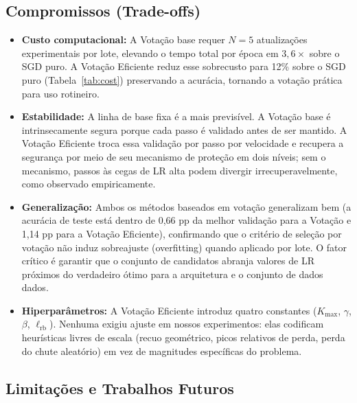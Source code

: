 \documentclass[conference]{IEEEtran}
\begin{document}
\subsection{Compromissos (Trade-offs)}

\begin{itemize}
\item \textbf{Custo computacional:} A Votação base requer $N = 5$ atualizações experimentais por lote, elevando o tempo total por época em $3,6\times$ sobre o SGD puro. A Votação Eficiente reduz esse sobrecusto para 12\% sobre o SGD puro (Tabela~\ref{tab:cost}) preservando a acurácia, tornando a votação prática para uso rotineiro.
\item \textbf{Estabilidade:} A linha de base fixa é a mais previsível. A Votação base é intrinsecamente segura porque cada passo é validado antes de ser mantido. A Votação Eficiente troca essa validação por passo por velocidade e recupera a segurança por meio de seu mecanismo de proteção em dois níveis; sem o mecanismo, passos às cegas de LR alta podem divergir irrecuperavelmente, como observado empiricamente.
\item \textbf{Generalização:} Ambos os métodos baseados em votação generalizam bem (a acurácia de teste está dentro de 0,66 pp da melhor validação para a Votação e 1,14 pp para a Votação Eficiente), confirmando que o critério de seleção por votação não induz sobreajuste (overfitting) quando aplicado por lote. O fator crítico é garantir que o conjunto de candidatos abranja valores de LR próximos do verdadeiro ótimo para a arquitetura e o conjunto de dados dados.
\item \textbf{Hiperparâmetros:} A Votação Eficiente introduz quatro constantes ($K_{\max}$, $\gamma$, $\beta$, $\ell_{\mathrm{rb}}$). Nenhuma exigiu ajuste em nossos experimentos: elas codificam heurísticas livres de escala (recuo geométrico, picos relativos de perda, perda do chute aleatório) em vez de magnitudes específicas do problema.
\end{itemize}

\subsection{Limitações e Trabalhos Futuros}
\end{document}

